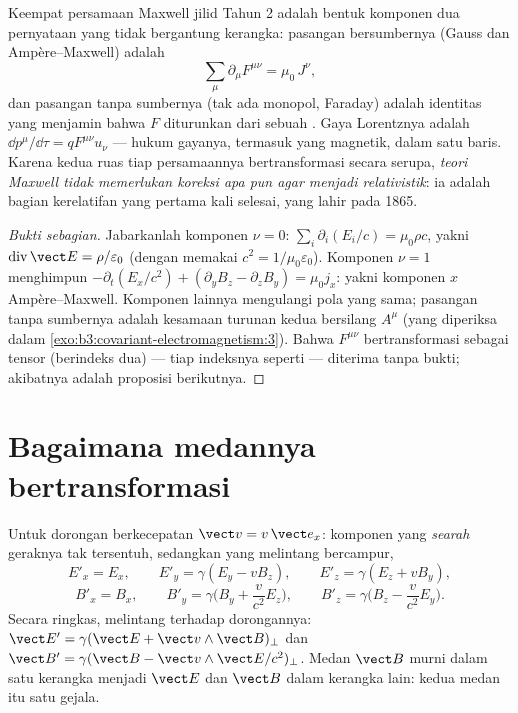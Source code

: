 \begin{theorem}\label{thm:b3:covariant-electromagnetism:maxwell}
Keempat persamaan Maxwell jilid Tahun 2 adalah bentuk komponen dua
pernyataan yang tidak bergantung kerangka: pasangan bersumbernya
(Gauss dan Ampère--Maxwell) adalah
\[
\sum_\mu \partial_\mu F^{\mu\nu} = \mu_0\,J^\nu ,
\]
dan pasangan tanpa sumbernya (tak ada monopol, Faraday) adalah
identitas yang menjamin bahwa $F$ diturunkan dari sebuah
. Gaya Lorentznya adalah $\dd p^\mu/\dd\tau = qF^{\mu\nu}u_\nu$
--- hukum gayanya, termasuk yang magnetik, dalam satu baris. Karena
kedua ruas tiap persamaannya bertransformasi secara serupa,
\emph{teori Maxwell tidak memerlukan koreksi apa pun agar menjadi
relativistik}: ia adalah bagian kerelatifan yang pertama kali selesai,
yang lahir pada 1865.
\end{theorem}

\begin{proof}[Bukti sebagian]
Jabarkanlah komponen $\nu = 0$: $\sum_i\partial_i(E_i/c) =
\mu_0\rho c$, yakni $\operatorname{div}\vect E = \rho/\varepsilon_0$
(dengan memakai $c^2 = 1/\mu_0\varepsilon_0$). Komponen $\nu = 1$
menghimpun $-\partial_t(E_x/c^2) + (\partial_yB_z - \partial_zB_y)
= \mu_0 j_x$: yakni komponen $x$ Ampère--Maxwell. Komponen lainnya
mengulangi pola yang sama; pasangan tanpa sumbernya adalah kesamaan
turunan kedua bersilang $A^\mu$ (yang diperiksa dalam
\cref{exo:b3:covariant-electromagnetism:3}). Bahwa $F^{\mu\nu}$
bertransformasi sebagai tensor (berindeks dua) --- tiap indeksnya
seperti  --- diterima tanpa bukti; akibatnya adalah
proposisi berikutnya.
\end{proof}

\section{Bagaimana medannya bertransformasi}

\begin{proposition}\label{prop:b3:covariant-electromagnetism:transform}
Untuk dorongan berkecepatan $\vect v = v\,\vect e_x$: komponen yang
\emph{searah} geraknya tak tersentuh, sedangkan yang melintang bercampur,
\[
E'_x = E_x , \qquad
E'_y = \gamma(E_y - vB_z) , \qquad
E'_z = \gamma(E_z + vB_y) ,
\]
\[
B'_x = B_x , \qquad
B'_y = \gamma\Big(B_y + \frac{v}{c^2}E_z\Big) , \qquad
B'_z = \gamma\Big(B_z - \frac{v}{c^2}E_y\Big) .
\]
Secara ringkas, melintang terhadap dorongannya: $\vect E' = \gamma(\vect E +
\vect v\wedge\vect B)_\perp$ dan $\vect B' = \gamma(\vect B - \vect
v\wedge\vect E/c^2)_\perp$. Medan $\vect B$ murni dalam satu kerangka
menjadi $\vect
E$ dan $\vect B$ dalam kerangka lain: kedua medan itu satu gejala.
\end{proposition}
\admitted


